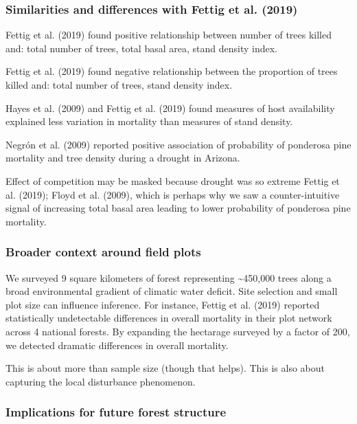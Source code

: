 \documentclass[]{article}
\begin{document}
\subsubsection{Similarities and differences with Fettig et al.
(2019)}\label{similarities-and-differences-with-fettig2019}

Fettig et al. (2019) found positive relationship between number of trees
killed and: total number of trees, total basal area, stand density
index.

Fettig et al. (2019) found negative relationship between the proportion
of trees killed and: total number of trees, stand density index.

Hayes et al. (2009) and Fettig et al. (2019) found measures of host
availability explained less variation in mortality than measures of
stand density.

Negrón et al. (2009) reported positive association of probability of
ponderosa pine mortality and tree density during a drought in Arizona.

Effect of competition may be masked because drought was so extreme
Fettig et al. (2019); Floyd et al. (2009), which is perhaps why we saw a
counter-intuitive signal of increasing total basal area leading to lower
probability of ponderosa pine mortality.

\subsubsection{Broader context around field
plots}\label{broader-context-around-field-plots}

We surveyed 9 square kilometers of forest representing
\textasciitilde{}450,000 trees along a broad environmental gradient of
climatic water deficit. Site selection and small plot size can influence
inference. For instance, Fettig et al. (2019) reported statistically
undetectable differences in overall mortality in their plot network
across 4 national forests. By expanding the hectarage surveyed by a
factor of 200, we detected dramatic differences in overall mortality.

This is about more than sample size (though that helps). This is also
about capturing the local disturbance phenomenon.

\subsubsection{Implications for future forest
structure}\label{implications-for-future-forest-structure}
\end{document}

